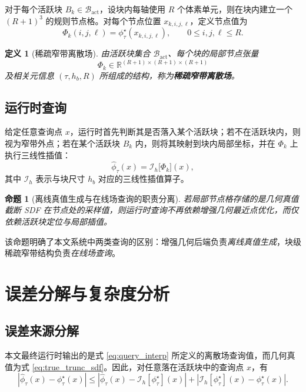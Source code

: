 \documentclass[11pt,a4paper]{ctexart}
\newtheorem{definition}{定义}
\newtheorem{proposition}{命题}
\begin{document}
对于每个活跃块 $B_k\in\mathcal{B}_{\mathrm{act}}$，设块内每轴使用 $R$ 个体素单元，则在块内建立一个 $(R+1)^3$ 的规则节点格。对每个节点位置 $x_{k,i,j,\ell}$，定义节点值为
\begin{equation}
\Phi_k(i,j,\ell)=\phi^{\star}_{\tau}(x_{k,i,j,\ell}),
\qquad 0\le i,j,\ell\le R.
\label{eq:block_nodes}
\end{equation}

\begin{definition}[稀疏窄带离散场]
由活跃块集合 $\mathcal{B}_{\mathrm{act}}$、每个块的局部节点张量
\[
\Phi_k\in\mathbb{R}^{(R+1)\times(R+1)\times(R+1)}
\]
及相关元信息 $(\tau,h_b,R)$ 所组成的结构，称为\textbf{稀疏窄带离散场}。
\end{definition}

\subsection{运行时查询}
给定任意查询点 $x$，运行时首先判断其是否落入某个活跃块；若不在活跃块内，则视为窄带外点；若在某个活跃块 $B_k$ 内，则将其映射到块内局部坐标，并在 $\Phi_k$ 上执行三线性插值：
\begin{equation}
\hat{\phi}_{\tau}(x)=\mathcal{I}_h\big[\Phi_k\big](x),
\label{eq:query_interp}
\end{equation}
其中 $\mathcal{I}_h$ 表示与块尺寸 $h_b$ 对应的三线性插值算子。

\begin{proposition}[离线真值生成与在线场查询的职责分离]
若局部节点格存储的是几何真值截断 SDF 在节点处的采样值，则运行时查询不再依赖增强几何最近点优化，而仅依赖活跃块定位与局部插值。
\end{proposition}

该命题明确了本文系统中两类查询的区别：增强几何后端负责\emph{离线真值生成}，块级稀疏窄带结构负责\emph{在线场查询}。

\section{误差分解与复杂度分析}

\subsection{误差来源分解}
本文最终运行时输出的是式 \eqref{eq:query_interp} 所定义的离散场查询值，而几何真值为式 \eqref{eq:true_trunc_sdf}。因此，对任意落在活跃块中的查询点 $x$，有
\begin{equation}
|\hat{\phi}_{\tau}(x)-\phi^{\star}_{\tau}(x)|
\le
|\hat{\phi}_{\tau}(x)-\mathcal{I}_h[\phi^{\star}_{\tau}](x)|
+
|\mathcal{I}_h[\phi^{\star}_{\tau}](x)-\phi^{\star}_{\tau}(x)|.
\label{eq:error_split}
\end{equation}
\end{document}
